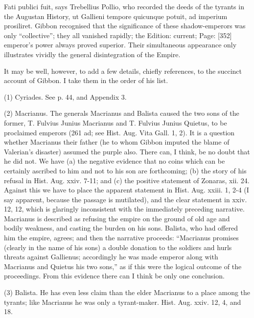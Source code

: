 
Fati publici fuit, says Trebellius Pollio, who recorded the deeds of the tyrants in the Augustan History, ut Gallieni tempore quicunque potuit, ad imperium prosiliret. Gibbon recognised that the significance of these shadow-emperors was only \texthebrew{“}collective\texthebrew{}”; they all vanished rapidly; the Edition: current; Page: [352] emperor\texthebrew{}’s power always proved superior. Their simultaneous appearance only illustrates vividly the general disintegration of the Empire.

It may be well, however, to add a few details, chiefly references, to the succinct account of Gibbon. I take them in the order of his list.

(1) Cyriades. See p. 44, and Appendix 3.

(2) Macrianus. The generals Macrianus and Balista caused the two sons of the former, T. Fulvius Junius Macrianus and T. Fulvius Junius Quietus, to be proclaimed emperors (261 ad; see Hist. Aug. Vita Gall. 1, 2). It is a question whether Macrianus their father (he to whom Gibbon imputed the blame of Valerian\texthebrew{}’s disaster) assumed the purple also. There can, I think, be no doubt that he did not. We have (a) the negative evidence that no coins which can be certainly ascribed to him and not to his son are forthcoming; (b) the story of his refusal in Hist. Aug. xxiv. 7-11; and (c) the positive statement of Zonaras, xii. 24. Against this we have to place the apparent statement in Hist. Aug. xxiii. 1, 2-4 (I say apparent, because the passage is mutilated), and the clear statement in xxiv. 12, 12, which is glaringly inconsistent with the immediately preceding narrative. Macrianus is described as refusing the empire on the ground of old age and bodily weakness, and casting the burden on his sons. Balista, who had offered him the empire, agrees; and then the narrative proceeds: \texthebrew{“}Macrianus promises (clearly in the name of his sons) a double donation to the soldiers and hurls threats against Gallienus; accordingly he was made emperor along with Macrianus and Quietus his two sons,\texthebrew{}” as if this were the logical outcome of the proceedings. From this evidence there can I think be only one conclusion.

(3) Balista. He has even less claim than the elder Macrianus to a place among the tyrants; like Macrianus he was only a tyrant-maker. Hist. Aug. xxiv. 12, 4, and 18.

